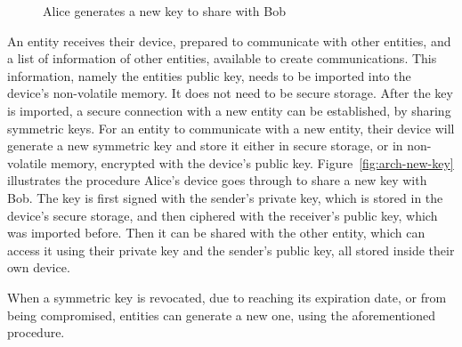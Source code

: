 \begin{figure}
	\centering     %
	\caption{Alice generates a new key to share with Bob}
\end{figure}

An entity receives their device, prepared to communicate with other entities, and a list of information of other entities, available to create communications. This information, namely the entities public key, needs to be imported into the device's non-volatile memory. It does not need to be secure storage.
After the key is imported, a secure connection with a new entity can be established, by sharing symmetric keys.
For an entity to communicate with a new entity, their device will generate a new symmetric key and store it either in secure storage, or in non-volatile memory, encrypted with the device's public key. Figure~\ref{fig:arch-new-key} illustrates the procedure Alice's device goes through to share a new key with Bob. The key is first signed with the sender's private key, which is stored in the device's secure storage, and then ciphered with the receiver's public key, which was imported before. Then it can be shared with the other entity, which can access it using their private key and the sender's public key, all stored inside their own device.

When a symmetric key is revocated, due to reaching its expiration date, or from being compromised, entities can generate a new one, using the aforementioned procedure.

